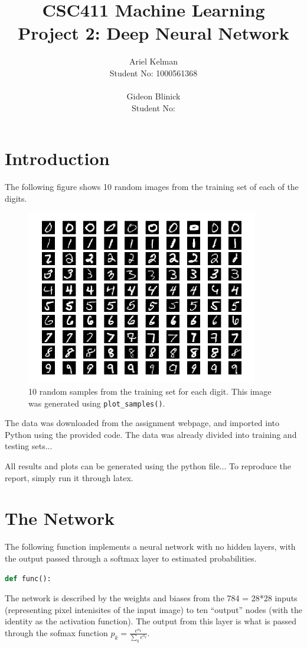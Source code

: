 \documentclass{article}
\title{CSC411 Machine Learning \\ Project 2: Deep Neural Network}
\author{ Ariel Kelman \\ Student No: 1000561368
         \\ \\
         Gideon Blinick \\ Student No: }
\begin{document}
   \maketitle{}


   \section{Introduction}
   The following figure shows 10 random images from the training set of each of the digits.
   \begin{figure}[H] \centering
      \includegraphics[width=4in]{resources/part1}
      \caption{10 random samples from the training set for each digit. This image
         was generated using \texttt{plot\_samples()}. }
   \end{figure}
   The data was downloaded from the assignment webpage, and imported into Python using the
   provided code. The data was already divided into training and testing sets...

   All results and plots can be generated using the python file...
   To reproduce the report, simply run it through latex.


   \section{The Network}
   The following function implements a neural network with no hidden layers, with the
   output passed through a softmax layer to estimated probabilities.

   \begin{lstlisting}[language=Python]
      def func():
   \end{lstlisting}

   The network is described by the weights and biases from the 784 = 28*28 inputs
   (representing pixel intenisites of the input image) to ten ``output'' nodes
   (with the identity as the activation function). The output from this layer is what is
   passed through the sofmax function $p_k = \frac{ e^{o_k} }{ \sum_q e^{o_q}}$.
\end{document}
